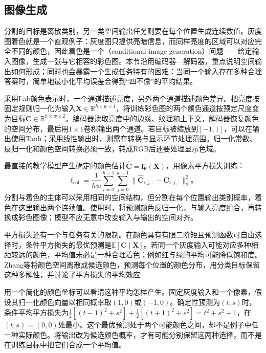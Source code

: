 \subsection{图像生成}
\label{sec:cnn-colorization}

分割的目标是离散类别，另一类空间输出任务则要在每个位置生成连续数值。灰度图着色就是一个直观例子：灰度图只提供亮暗信息，而同样亮度的区域可以对应完全不同的颜色，因此着色是一个（conditional image generation）问题——给定输入图像，生成一张与它相容的彩色图。本节沿用编码器—解码器，重点说明空间输出如何形成；同时也会暴露一个生成任务特有的困难：当同一个输入存在多种合理答案时，简单地最小化平均误差会得到“四不像”的平均结果。

采用Lab颜色表示时，一个通道描述亮度，另外两个通道描述颜色差异。把亮度按固定规则归一化为输入$\bm X\in\mathbb R^{h\times w\times1}$，将训练彩色图的两个颜色通道按预定尺度变为目标$\bm C\in\mathbb R^{h\times w\times2}$。编码器读取亮度中的边缘、纹理和上下文，解码器恢复颜色的空间分布，最后用$1\times1$卷积输出两个通道。若目标被缩放到$[-1,1]$，可以在输出使用Tanh；采用线性输出时，则需在转换与显示环节处理范围。归一化常数、反归一化和颜色空间转换必须一致，转成RGB后还要处理显示色域。

最直接的教学模型产生确定的颜色估计$\widehat{\bm C}=\bm f_{\bm\theta}(\bm X)$，用像素平方损失训练：
\begin{equation}
  \ell_{\mathrm{col}}=\frac1{hw}\sum_{i=0}^{h-1}\sum_{j=0}^{w-1}
      \lVert\widehat{\bm C}_{i,j,:}-\bm C_{i,j,:}\rVert_2^2\text{。}
  \label{eq:cnn-colorization-loss}
\end{equation}
分割与着色的主体可以采用相同的空间结构，但分割在每个位置输出类别概率，着色在这里输出两个连续值。使用时，将预测颜色反归一化，与输入亮度组合，再转换成彩色图像；模型不应无意中改变输入与输出的空间对齐。

平方损失还有一个与任务有关的限制。在颜色具有有限二阶矩且预测函数可自由选择时，条件平方损失的最优预测是$\mathbb E[\bm C\mid\bm X]$。若同一个灰度输入可能对应多种相距较远的颜色，平均值未必是一种合理着色；例如红与绿的平均可能降低饱和度。Zhang等将颜色空间离散成候选颜色，预测每个位置的颜色分布，用分类目标保留这种多解性，并讨论了平方损失的平均效应

用一个简化的颜色坐标可以看清这种平均怎样产生。固定灰度输入和一个像素，假设其归一化颜色向量以相同概率取$(1,0)$或$(-1,0)$。确定性预测为$(t,s)$时，条件平均平方损失为$\tfrac12[(t-1)^2+s^2]+\tfrac12[(t+1)^2+s^2]=t^2+s^2+1$，在$(t,s)=(0,0)$处最小。这个最优预测处于两个可能颜色之间，却不是例子中任一种实际颜色。将输出改为候选颜色概率，才有可能分别保留这两种选择，而不是在训练目标中把它们合成一个平均值。

